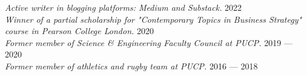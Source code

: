 \textit{Active writer in blogging platforms: Medium and Substack.} \hfill 2022 \\
\textit{Winner of a partial scholarship for "Contemporary Topics in Business Strategy" course in Pearson College London.} \hfill 2020 \\
\textit{Former member of Science \& Engineering Faculty Council at PUCP.} \hfill 2019 --- 2020 \\
\textit{Former member of athletics and rugby team at PUCP.} \hfill 2016 --- 2018 \\

